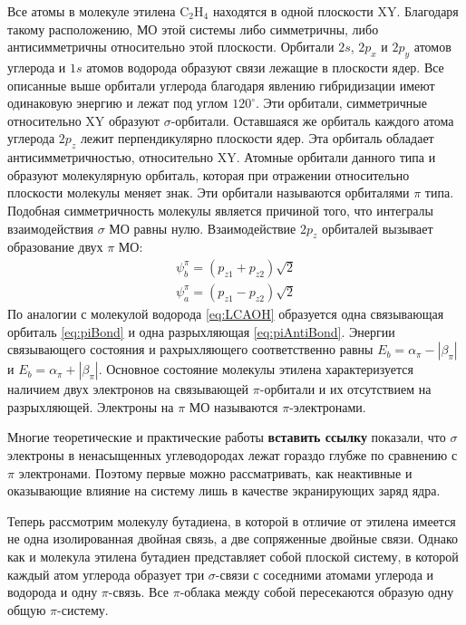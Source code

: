 Все атомы в молекуле этилена C${}_2$H${}_4$ находятся в одной плоскости XY. 
Благодаря такому расположению, МО этой системы либо симметричны, либо антисимметричны относительно этой плоскости. 
Орбитали $2s$, $2p_x$ и $2p_y$ атомов углерода и $1s$ атомов водорода образуют связи лежащие в плоскости ядер. 
Все описанные выше орбитали углерода благодаря явлению гибридизации имеют одинаковую энергию и лежат под углом $120^{\circ}$. 
Эти орбитали, симметричные относительно XY образуют $\sigma$-орбитали. 
Оставшаяся же орбиталь каждого атома углерода $2p_z$ лежит перпендикулярно плоскости ядер. 
Эта орбиталь обладает антисимметричностью, относительно XY. 
Атомные орбитали  данного типа и образуют молекулярную орбиталь, которая при отражении относительно плоскости молекулы меняет знак. 
Эти орбитали называются орбиталями $\pi$ типа. 
Подобная симметричность молекулы является причиной того, что интегралы взаимодействия $\sigma$ МО равны нулю. 
Взаимодействие $2p_z$ орбиталей вызывает образование двух $\pi$ МО:
\begin{eqnarray}
\label{eq:piBond}
\psi_b^{\pi}=(p_{z1}+p_{z2})\sqrt{2}\\
\label{eq:piAntiBond}
\psi_a^{\pi}=(p_{z1}-p_{z2})\sqrt{2}
\end{eqnarray}
По аналогии с молекулой водорода \ref{eq:LCAOH} образуется одна связывающая орбиталь \ref{eq:piBond} и одна разрыхляющая \ref{eq:piAntiBond}. 
Энергии связывающего состояния и рахрыхляющего соответственно равны $E_b=\alpha_\pi-|\beta_\pi|$ и $E_b=\alpha_\pi+|\beta_\pi|$. 
Основное состояние молекулы этилена характеризуется наличием двух электронов на связывающей $\pi$-орбитали и их отсутствием на разрыхляющей.
 Электроны на $\pi$ МО называются $\pi$-электронами.

Многие теоретические и практические работы \textbf{вставить ссылку} показали, что $\sigma$ электроны в ненасыщенных углеводородах лежат гораздо глубже по сравнению с $\pi$ электронами. 
Поэтому первые можно рассматривать, как неактивные и оказывающие влияние на систему лишь в качестве экранирующих заряд ядра. 

Теперь рассмотрим молекулу бутадиена, в которой в отличие от этилена имеется не одна изолированная двойная связь, а две сопряженные двойные связи. 
Однако как и молекула этилена бутадиен представляет собой плоской систему, в которой каждый атом углерода образует три $\sigma$-связи с соседними атомами углерода и водорода и одну $\pi$-связь. 
Все $\pi$-облака между собой пересекаются образую одну общую $\pi$-систему.

